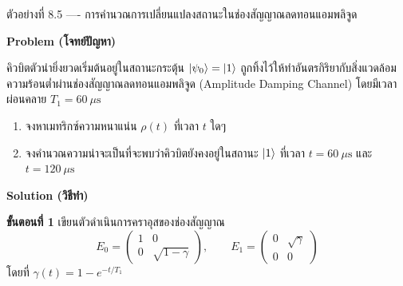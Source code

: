 \begin{psctbox}{ตัวอย่างที่ 8.5 ---- การคำนวณการเปลี่ยนแปลงสถานะในช่องสัญญาณลดทอนแอมพลิจูด}

\textbf{Problem (โจทย์ปัญหา)}

คิวบิตตัวนำยิ่งยวดเริ่มต้นอยู่ในสถานะกระตุ้น $\ket{\psi_0} = \ket{1}$ ถูกทิ้งไว้ให้ทำอันตรกิริยากับสิ่งแวดล้อมความร้อนต่ำผ่านช่องสัญญาณลดทอนแอมพลิจูด (Amplitude Damping Channel) โดยมีเวลาผ่อนคลาย $T_1 = 60~\mu\text{s}$
\begin{enumerate}
    \item จงหาเมทริกซ์ความหนาแน่น $\rho(t)$ ที่เวลา $t$ ใดๆ
    \item จงคำนวณความน่าจะเป็นที่จะพบว่าคิวบิตยังคงอยู่ในสถานะ $\ket{1}$ ที่เวลา $t = 60~\mu\text{s}$ และ $t = 120~\mu\text{s}$
\end{enumerate}

\textbf{Solution (วิธีทำ)}

\textbf{ขั้นตอนที่ 1} เขียนตัวดำเนินการคราอุสของช่องสัญญาณ
\begin{equation*}
E_0 = \begin{pmatrix} 1 & 0 \\ 0 & \sqrt{1 - \gamma} \end{pmatrix}, \qquad E_1 = \begin{pmatrix} 0 & \sqrt{\gamma} \\ 0 & 0 \end{pmatrix}
\end{equation*}
โดยที่ $\gamma(t) = 1 - e^{-t/T_1}$


\end{psctbox}
